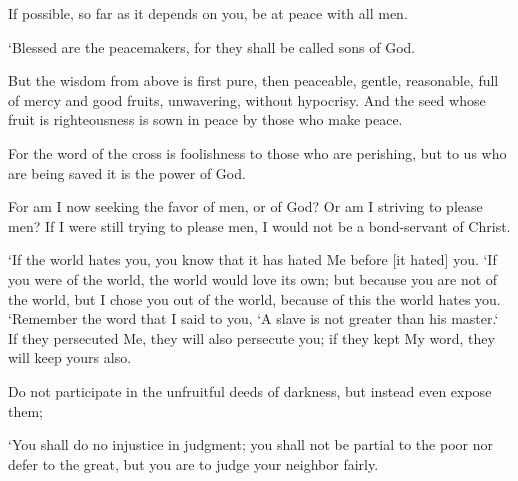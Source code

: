 \begin{scripture}[Romans 12:18]
    If possible, so far as it depends on you, be at peace with all men.
\end{scripture}

\begin{scripture}[Matthew 5:9]
    `Blessed are the peacemakers, for they shall be called sons of God.
\end{scripture}

\begin{scripture}[James 3:17-18]
    But the wisdom from above is first pure, then peaceable, gentle, reasonable, full of mercy and good fruits, unwavering, without hypocrisy.
    And the seed whose fruit is righteousness is sown in peace by those who make peace.
\end{scripture}

\begin{scripture}[1 Corinthians 1:18]
    For the word of the cross is foolishness to those who are perishing, but to us who are being saved it is the power of God.
\end{scripture}

\begin{scripture}[Galatians 1:10]
    For am I now seeking the favor of men, or of God? Or am I striving to please men? If I were still trying to please men, I would not be a bond-servant of Christ.
\end{scripture}

\begin{scripture}[John 15:18-20]
    `If the world hates you, you know that it has hated Me before [it hated] you.
    `If you were of the world, the world would love its own; but because you are not of the world, but I chose you out of the world, because of this the world hates you.
    `Remember the word that I said to you, `A slave is not greater than his master.` If they persecuted Me, they will also persecute you; if they kept My word, they will keep yours also.
\end{scripture}

\begin{scripture}[Ephesians 5:11]
    Do not participate in the unfruitful deeds of darkness, but instead even expose them;
\end{scripture}

\begin{scripture}[Leviticus 19:15]
    `You shall do no injustice in judgment; you shall not be partial to the poor nor defer to the great, but you are to judge your neighbor fairly.
\end{scripture}

